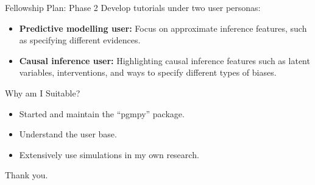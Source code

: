 \documentclass{beamer}
\begin{document}
\begin{frame}{Fellowship Plan: Phase 2}
	Develop tutorials under two user personas:

	\vspace{2em}

	\begin{itemize}
		\item \textbf{Predictive modelling user:} Focus on approximate inference features, such as specifying different evidences.
		\item \textbf{Causal inference user:} Highlighting causal inference features such as latent variables, interventions, and ways to specify different types of biases.
	\end{itemize}
\end{frame}

\begin{frame}{Why am I Suitable?}
	\begin{itemize}
		\item Started and maintain the ``pgmpy'' package.
		\item Understand the user base. 
		\item Extensively use simulations in my own research.
	\end{itemize}
\end{frame}

\begin{frame}
	\huge{Thank you.}
\end{frame}
\end{document}
